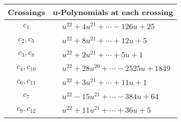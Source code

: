 \documentclass[1p]{elsarticle_modified}
\theoremstyle{definition}
\begin{document}
\begin{tabular}{m{50pt}|m{274pt}}
Crossings & \hspace{64pt}u-Polynomials at each crossing \\
\hline $$\begin{aligned}c_{1}\end{aligned}$$&$\begin{aligned}
&u^{22}+4 u^{21}+\cdots-126 u+25
\end{aligned}$\\
\hline $$\begin{aligned}c_{2},c_{5}\end{aligned}$$&$\begin{aligned}
&u^{22}+8 u^{21}+\cdots+12 u+5
\end{aligned}$\\
\hline $$\begin{aligned}c_{3},c_{8}\end{aligned}$$&$\begin{aligned}
&u^{22}+2 u^{21}+\cdots+5 u+1
\end{aligned}$\\
\hline $$\begin{aligned}c_{4},c_{10}\end{aligned}$$&$\begin{aligned}
&u^{22}+28 u^{20}+\cdots-2525 u+1849
\end{aligned}$\\
\hline $$\begin{aligned}c_{6},c_{11}\end{aligned}$$&$\begin{aligned}
&u^{22}+3 u^{21}+\cdots+11 u+1
\end{aligned}$\\
\hline $$\begin{aligned}c_{7}\end{aligned}$$&$\begin{aligned}
&u^{22}-15 u^{21}+\cdots-384 u+64
\end{aligned}$\\
\hline $$\begin{aligned}c_{9},c_{12}\end{aligned}$$&$\begin{aligned}
&u^{22}+11 u^{21}+\cdots+36 u+5
\end{aligned}$\\
\hline
\end{tabular}\\~\\
\newpage\renewcommand{\arraystretch}{1}
\end{document}

